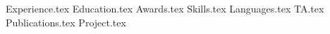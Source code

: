 \documentclass[11pt, a4paper]{awesome-cv}
\newcommand*{\sectiondir}{resume/}
\begin{document}
\makecvheader
\hspace{14.17 cm}


{Experience.tex}
\vspace{0.5 cm}
{Education.tex}
\vspace{0.5 cm}
{Awards.tex}
\vspace{0.5 cm}
{Skills.tex}
\vspace{0.5 cm}
{Languages.tex}
\vspace{0.5 cm}
{TA.tex}
\vspace{0.5 cm}
{Publications.tex}
\vspace{0.5 cm}
{Project.tex}
\vspace{0.5 cm}
\end{document}

